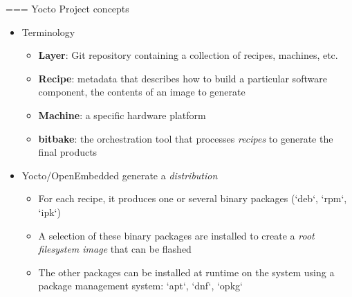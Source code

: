 === {Yocto Project concepts}
  \begin{itemize}
  \item Terminology
    \begin{itemize}
    \item {\bf Layer}: Git repository containing a collection of
      recipes, machines, etc.
    \item {\bf Recipe}: metadata that describes how to build a
      particular software component, the contents of an image to
      generate
    \item {\bf Machine}: a specific hardware platform
    \item {\bf bitbake}: the orchestration tool that processes {\em
        recipes} to generate the final products
    \end{itemize}
  \item Yocto/OpenEmbedded generate a {\em distribution}
    \begin{itemize}
    \item For each recipe, it produces one or several binary packages
      (`deb`, `rpm`, `ipk`)
    \item A selection of these binary packages are installed to create
      a {\em root filesystem image} that can be flashed
    \item The other packages can be installed at runtime on the system
      using a package management system: `apt`, `dnf`,
      `opkg`
    \end{itemize}
  \end{itemize}


